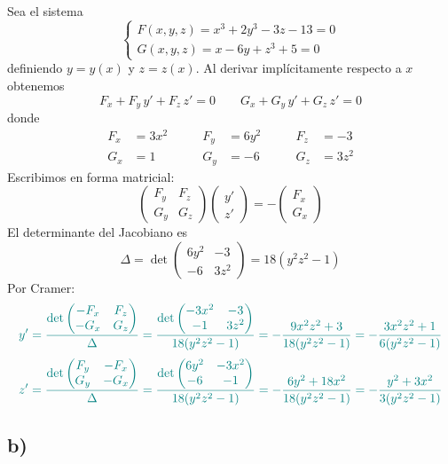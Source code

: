 \documentclass{article}
\begin{document}
Sea el sistema
\[
\begin{cases}
F(x,y,z) = x^3 + 2y^3 - 3z - 13 = 0\\[4pt]
G(x,y,z) = x - 6y + z^3 + 5 = 0
\end{cases}
\]
definiendo \(y = y(x)\) y \(z = z(x)\). Al derivar implícitamente respecto a \(x\) obtenemos
\[
F_x + F_y\,y' + F_z\,z' = 0
\qquad
G_x + G_y\,y' + G_z\,z' = 0
\]
donde
\[
\begin{aligned}
F_x &= 3x^2 &\qquad F_y &= 6y^2 &\qquad F_z &= -3\\
G_x &= 1    &\qquad G_y &= -6   &\qquad G_z &= 3z^2
\end{aligned}
\]
Escribimos en forma matricial:
\[
\begin{pmatrix}
F_y & F_z\\
G_y & G_z
\end{pmatrix}
\begin{pmatrix}
y'\\
z'
\end{pmatrix}
=
-
\begin{pmatrix}
F_x\\
G_x
\end{pmatrix}
\]
El determinante del Jacobiano es
\[
\Delta
= \det
\begin{pmatrix}
6y^2 & -3\\
-6   & 3z^2
\end{pmatrix}
= 18(y^2z^2-1)
\]
Por Cramer:
\[
\color{teal}
y'
=\frac{\det\begin{pmatrix} -F_x & F_z\\ -G_x & G_z \end{pmatrix}}{\Delta}
=\frac{\det\begin{pmatrix} -3x^2 & -3\\ -1 & 3z^2 \end{pmatrix}}{18(y^2z^2-1)}
=-\frac{9x^2z^2+3}{18(y^2z^2-1)}
=-\frac{3x^2z^2+1}{6(y^2z^2-1)}
\]
\[
\color{teal}
z'
=\frac{\det\begin{pmatrix} F_y & -F_x\\ G_y & -G_x \end{pmatrix}}{\Delta}
=\frac{\det\begin{pmatrix} 6y^2 & -3x^2\\ -6 & -1 \end{pmatrix}}{18(y^2z^2-1)}
=-\frac{6y^2+18x^2}{18(y^2z^2-1)}
=-\frac{y^2+3x^2}{3(y^2z^2-1)}
\]

\subsection*{b)}
\end{document}
